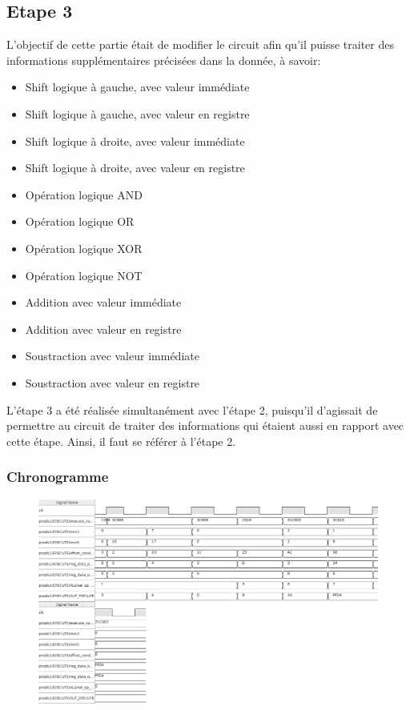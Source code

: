 \documentclass[a4paper]{article} %
\begin{document}
\subsection{Etape 3}
L'objectif de cette partie était de modifier le circuit afin qu'il puisse traiter des informations supplémentaires précisées dans la donnée, à savoir:
\medskip

\begin{itemize}
    \item Shift logique à gauche, avec valeur immédiate
    \item Shift logique à gauche, avec valeur en registre
    \item Shift logique à droite, avec valeur immédiate
    \item Shift logique à droite, avec valeur en registre
    \item Opération logique AND
    \item Opération logique OR
    \item Opération logique XOR
    \item Opération logique NOT
    \item Addition avec valeur immédiate
    \item Addition avec valeur en registre
    \item Soustraction avec valeur immédiate
    \item Soustraction avec valeur en registre
\end{itemize}
L'étape 3 a été réalisée simultanément avec l'étape 2, puisqu'il d'agissait de permettre au circuit de traiter des informations qui étaient aussi en rapport avec cette étape. Ainsi, il faut se référer à l'étape 2.

\subsubsection{Chronogramme}
\begin{figure}[H]
    \centering
    \includegraphics[width=1\textwidth]{src/CHRONO_FINAL.png}
    \label{fig:chrono_final_pic}
\end{figure}
\end{document}
